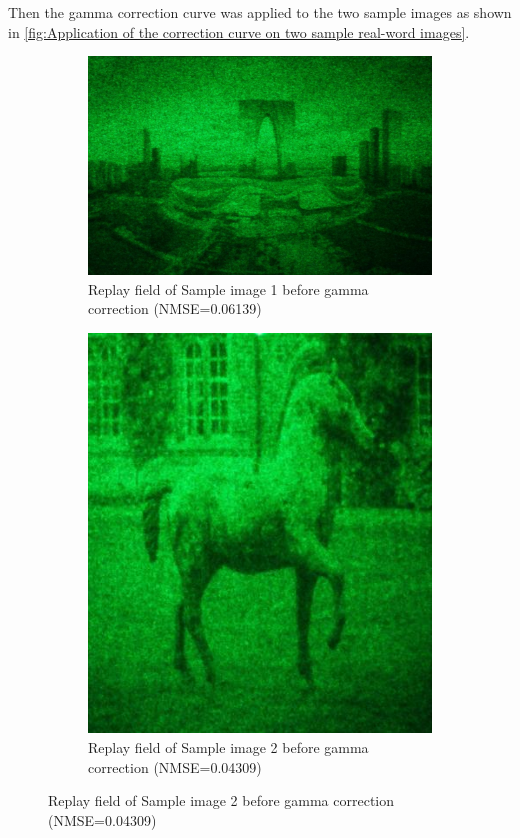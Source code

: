 Then the gamma correction curve was applied to the two sample images as shown in \cref{fig:Application of the correction curve on two sample real-word images}.

\begin{figure}[H]
  \centering
  \begin{subfigure}[t]{0.4\textwidth}
    \includegraphics[width=\textwidth]{szzx_original.jpg}
    \caption{Replay field of Sample image 1 before gamma correction (NMSE=0.06139)}\label{fig:szzx_original}
  \end{subfigure}
  \quad
  \begin{subfigure}[t]{0.219\textwidth}
    \includegraphics[width=\textwidth]{horse_original.jpg}
    \caption{Replay field of Sample image 2 before gamma correction (NMSE=0.04309)}\label{fig:horse_original}
  \end{subfigure}


\end{figure}
